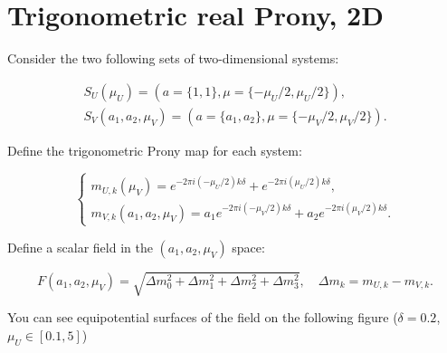 \section{Trigonometric real Prony, 2D}

Consider the two following sets of two-dimensional systems:

$$
\begin{array}{l}
S_U(\mu_U) = (a = \{1, 1\}, \mu = \{ -\mu_U/2, \mu_U/2 \}),  \\
S_V(a_1, a_2, \mu_V) = (a = \{a_1, a_2\}, \mu = \{ -\mu_V/2, \mu_V/2 \}).
\end{array}
$$

Define the trigonometric Prony map for each system: 

$$
\begin{cases}
m_{U,k}(\mu_V) = e^{-2\pi i (-\mu_U/2) k \delta} + e^{-2\pi i (\mu_U/2) k \delta}, \\
m_{V,k}(a_1, a_2, \mu_V) = a_1 e^{-2\pi i (-\mu_V/2) k \delta} + a_2 e^{-2\pi i (\mu_V/2) k \delta}.
\end{cases}
$$

Define a scalar field in the $(a_1, a_2, \mu_V)$ space:

$$
F(a_1, a_2, \mu_V) = \sqrt{\Delta m_0^2 + \Delta m_1^2 + \Delta m_2^2 + \Delta m_3^2}, \quad \Delta m_k = m_{U,k} - m_{V,k}.
$$

You can see equipotential surfaces of the field on the following figure ($\delta = 0.2$, $\mu_U \in [0.1, 5]$)
  
  
